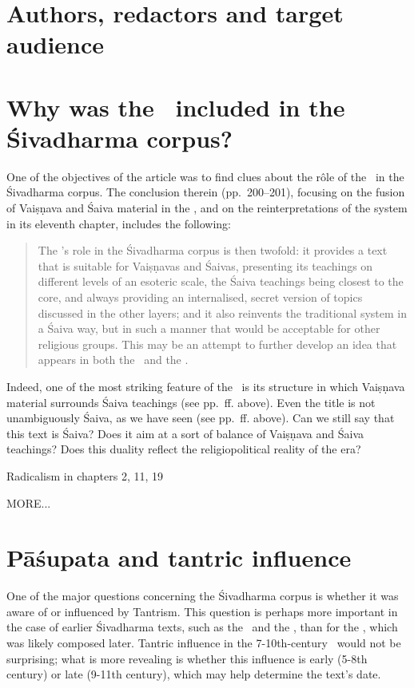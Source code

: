 \section{Authors, redactors and target audience}


\section{Why was the \VSS\ included in the Śivadharma corpus?}

One of the objectives of the article 
 was
to find clues about the r\^ole of the \VSS\ in the Śivadharma corpus.
The conclusion  therein (pp.~200--201), focusing on the fusion of 
Vaiṣṇava and Śaiva material in the \VSS, and on the reinterpretations of 
the  system in its eleventh chapter, includes the following:

\begin{quote}
The \Vss's role in the Śivadharma corpus is then twofold: 
it provides a text that is suitable for Vaiṣṇavas and Śaivas,
presenting its teachings on different levels of an esoteric scale, 
the Śaiva teachings being closest to the core, and always
providing an internalised, secret version of topics 
discussed in the other layers; and it also reinvents the traditional 
 system in a Śaiva way,
but in such a manner that would be acceptable for other religious groups. 
This may be an attempt to further develop an idea that appears in both 
the \SDhS\ and the \SDhU.
\end{quote}

\noindent
Indeed, one of the most striking feature of the \VSS\
is its structure in which Vaiṣṇava material surrounds
Śaiva teachings (see pp.~\pageref{structure}\thinspace ff. above). 
Even the title is not unambiguously Śaiva, as
we have seen (see pp.~\pageref{title}ff. above).
Can we still say that this text is Śaiva? Does it
aim at a sort of balance of Vaiṣṇava and Śaiva
teachings? Does this duality reflect the 
religio\-political reality of the era?

Radicalism in chapters 2, 11, 19

MORE...






\section{Pāśupata and tantric influence}
One of the major questions concerning the Śivadharma corpus is whether it was aware of or influenced by Tantrism. This question is perhaps more important in the case of earlier Śivadharma texts, such as the \SDhS\ and the \SDhU, than for the \VSS, which was likely composed later. Tantric influence in the 7-10th-century \VSS\ would not be surprising; what is more revealing is whether this influence is early (5-8th century) or late (9-11th century), which may help determine the text's date.


